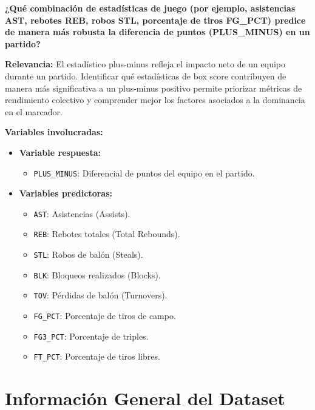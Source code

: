 \documentclass[12pt]{article}
\begin{document}
\textbf{¿Qué combinación de estadísticas de juego (por ejemplo, asistencias AST, rebotes REB, robos STL, porcentaje de tiros FG\_PCT) predice de manera más robusta la diferencia de puntos (PLUS\_MINUS) en un partido?}

\vspace{0.3cm}

\textbf{Relevancia:}  
El estadístico plus-minus refleja el impacto neto de un equipo durante un partido. Identificar qué estadísticas de box score contribuyen de manera más significativa a un plus-minus positivo permite priorizar métricas de rendimiento colectivo y comprender mejor los factores asociados a la dominancia en el marcador.

\vspace{0.3cm}

\textbf{Variables involucradas:}
\begin{itemize}
    \setlength\itemsep{0.1em}
    \item \textbf{Variable respuesta:}
    \begin{itemize}
        \item \texttt{PLUS\_MINUS}: Diferencial de puntos del equipo en el partido.
    \end{itemize}
    \item \textbf{Variables predictoras:}
    \begin{itemize}
        \item \texttt{AST}: Asistencias (Assists).
        \item \texttt{REB}: Rebotes totales (Total Rebounds).
        \item \texttt{STL}: Robos de balón (Steals).
        \item \texttt{BLK}: Bloqueos realizados (Blocks).
        \item \texttt{TOV}: Pérdidas de balón (Turnovers).
        \item \texttt{FG\_PCT}: Porcentaje de tiros de campo.
        \item \texttt{FG3\_PCT}: Porcentaje de triples.
        \item \texttt{FT\_PCT}: Porcentaje de tiros libres.
    \end{itemize}
\end{itemize}

\vspace{0.3cm}

\section{Información General del Dataset}
\end{document}
